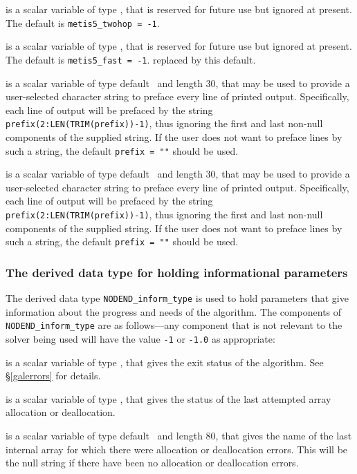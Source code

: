\documentclass{galahad}
\newcommand{\packagename}{NODEND}
\begin{document}
\begin{description}
 is a scalar variable of type \integer, 
that is reserved for future use but ignored at present.
The default is {\tt metis5\_twohop = -1}.

 is a scalar variable of type \integer, 
that is reserved for future use but ignored at present.
The default is {\tt metis5\_fast = -1}.
replaced by this default.

 is a scalar variable of type default \character\
and length 30, that may be used to provide a user-selected
character string to preface every line of printed output.
Specifically, each line of output will be prefaced by the string
{\tt prefix(2:LEN(TRIM(prefix))-1)},
thus ignoring the first and last non-null components of the
supplied string. If the user does not want to preface lines by such
a string, the default {\tt prefix = ""} should be used.

 is a scalar variable of type default \character\
and length 30, that may be used to provide a user-selected
character string to preface every line of printed output.
Specifically, each line of output will be prefaced by the string
{\tt prefix(2:LEN(TRIM(prefix))-1)},
thus ignoring the first and last non-null components of the
supplied string. If the user does not want to preface lines by such
a string, the default {\tt prefix = ""} should be used.

\end{description}


\subsubsection{The derived data type for holding informational
 parameters}\label{typeinform}
The derived data type
{\tt \packagename\_inform\_type}
is used to hold parameters that give information about the progress and needs
of the algorithm. The components of
{\tt \packagename\_inform\_type}
are as follows---any component that is not relevant to the solver being used
will have the value {\tt -1} or {\tt -1.0} as appropriate:

\begin{description}

 is a scalar variable of type \integer, that gives the
exit status of the algorithm.
See \S\ref{galerrors}
for details.

 is a scalar variable of type \integer, that gives
the status of the last attempted array allocation or deallocation.

\itt{bad\_alloc} is a scalar variable of type default \character\
and length 80, that  gives the name of the last internal array
for which there were allocation or deallocation errors.
This will be the null string if there have been no
allocation or deallocation errors.

\end{description}
\end{document}

